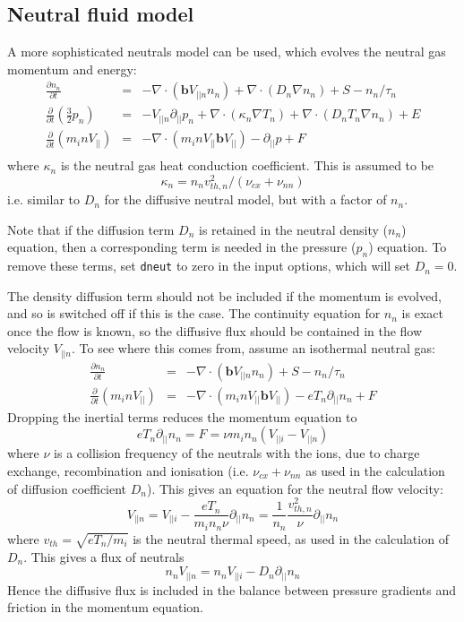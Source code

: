 \documentclass[12pt,a4paper]{article}
\newcommand{\bvec}{\mathbf{b}}
\begin{document}
\subsection{Neutral fluid model}

A more sophisticated neutrals model can be used, which evolves the neutral gas momentum and energy:
\begin{eqnarray*}
  \frac{\partial n_n}{\partial t} &=& - \nabla\cdot\left( \bvec V_{||n} n_n\right) + {\nabla\cdot\left(D_n\nabla n_n\right)} + S - n_n / \tau_n\\
  \frac{\partial}{\partial t}\left(\frac{3}{2}p_n\right) &=& -V_{||n}\partial_{||}p_n + \nabla\cdot\left(\kappa_n\nabla T_n\right) + \nabla\cdot\left(D_nT_n\nabla n_n\right) + E \\
  \frac{\partial}{\partial t}\left(m_i nV_{||}\right) &=& -\nabla\cdot\left(m_inV_{||}\bvec V_{||}\right) - \partial_{||} p + F\\
\end{eqnarray*}
where $\kappa_n$ is the neutral gas heat conduction coefficient. This is assumed to be
\[
\kappa_n = n_n v_{th,n}^2 / \left(\nu_{cx} + \nu_{nn}\right)
\]
i.e. similar to $D_n$ for the diffusive neutral model, but with a factor of $n_n$.

Note that if the diffusion term $D_n$ is retained in the neutral density ($n_n$) equation, then a corresponding term is needed in
the pressure ($p_n$) equation.  To remove these terms, set \texttt{dneut} to zero in the input options, which will set $D_n = 0$.

The density diffusion term should not be included if the momentum is evolved, and so is switched off if this is the case.
The continuity equation for $n_n$ is exact once the flow is known, so the diffusive flux
should be contained in the flow velocity $V_{||n}$. To see where this comes from, assume an isothermal neutral gas:
\begin{eqnarray*}
  \frac{\partial n_n}{\partial t} &=& - \nabla\cdot\left( \bvec V_{||n} n_n\right) + S - n_n / \tau_n\\
  \frac{\partial}{\partial t}\left(m_i nV_{||}\right) &=& -\nabla\cdot\left(m_inV_{||}\bvec V_{||}\right) - eT_n\partial_{||} n_n + F
\end{eqnarray*}
Dropping the inertial terms reduces the momentum equation to
\[
eT_n\partial_{||} n_n = F = \nu m_i n_n \left(V_{||i} - V_{||n}\right)
\]
where $\nu$ is a collision frequency of the neutrals with the ions, due to charge exchange, recombination and ionisation
(i.e. $\nu_{cx} + \nu_{nn}$ as used in the calculation of diffusion coefficient $D_n$).
This gives an equation for the neutral flow velocity:
\[
V_{||n} = V_{||i} - \frac{eT_n}{m_i n_n \nu}\partial_{||} n_n = \frac{1}{n_n}\frac{v_{th,n}^2}{\nu}\partial_{||} n_n 
\]
where $v_{th} = \sqrt{eT_n / m_i}$ is the neutral thermal speed, as used in the calculation of $D_n$. This gives a flux
of neutrals
\[
n_nV_{||n} = n_nV_{||i} - D_n\partial_{||} n_n
\]
Hence the diffusive flux is included in the balance between pressure gradients and friction in the momentum equation.
\end{document}
